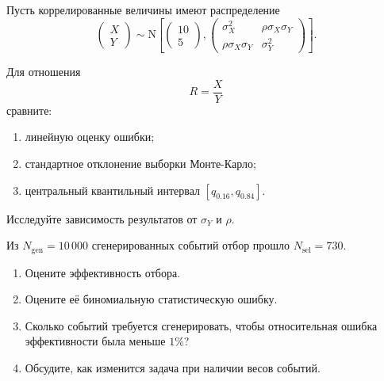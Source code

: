 \documentclass[
  russian,
  11pt,
  a4paper,
  open=any]{scrbook}
\providecommand{\tightlist}{%
  \setlength{\itemsep}{0pt}\setlength{\parskip}{0pt}}
\begin{document}
\begin{semanticpdfbox}[colback=BookCoralSoft,borderline west={1.2mm}{0pt}{BookCoral}]

\par\nopagebreak[4]\vspace{1.2mm}

Пусть коррелированные величины имеют распределение \[
\begin{pmatrix}X\\Y\end{pmatrix}
\sim
\mathrm N\!\left[
\begin{pmatrix}10\\5\end{pmatrix},
\begin{pmatrix}
\sigma_X^2 & \rho\sigma_X\sigma_Y\\
\rho\sigma_X\sigma_Y & \sigma_Y^2
\end{pmatrix}
\right].
\]

Для отношения \[
R=\frac{X}{Y}
\] сравните:

\begin{enumerate}
\def\labelenumi{\arabic{enumi}.}
\tightlist
\item
  линейную оценку ошибки;
\item
  стандартное отклонение выборки Монте-Карло;
\item
  центральный квантильный интервал \([q_{0.16},q_{0.84}]\).
\end{enumerate}

Исследуйте зависимость результатов от \(\sigma_Y\) и \(\rho\).

\end{semanticpdfbox}

\begin{semanticpdfbox}[colback=BookCoralSoft,borderline west={1.2mm}{0pt}{BookCoral}]

\par\nopagebreak[4]\vspace{1.2mm}

Из \(N_{\mathrm{gen}}=10\,000\) сгенерированных событий отбор прошло
\(N_{\mathrm{sel}}=730\).

\begin{enumerate}
\def\labelenumi{\arabic{enumi}.}
\tightlist
\item
  Оцените эффективность отбора.
\item
  Оцените её биномиальную статистическую ошибку.
\item
  Сколько событий требуется сгенерировать, чтобы относительная ошибка
  эффективности была меньше \(1\%\)?
\item
  Обсудите, как изменится задача при наличии весов событий.
\end{enumerate}

\end{semanticpdfbox}
\end{document}
